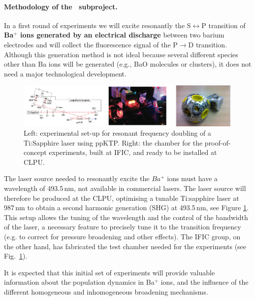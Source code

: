 \paragraph{Methodology of the \BATA\ subproject.}

In a first round of experiments we will excite resonantly the S$\leftrightarrow$P transition of {\bf Ba$^+$ ions generated by an electrical discharge} between two barium electrodes and will collect the fluorescence signal of the P$\rightarrow$D transition. Although this generation method is not ideal because several different species other than Ba ions will be generated (e.g., BaO molecules or clusters), it does not need a major technological development. 

\begin{figure}
\begin{center}
\includegraphics[width=0.99\textwidth]{img/blueLaser.png}
\caption{\small Left: experimental set-up for resonant frequency doubling of a 
Ti:Sapphire laser using ppKTP. Right: the chamber for the proof-of-concept experiments, built at IFIC, and ready to be installed at CLPU.}
\label{fig:chamber}
\end{center}
\end{figure}

The laser source needed to resonantly excite the $Ba^{+}$ ions must have a wavelength of 493.5\,nm, not available in commercial lasers. The laser source will therefore be produced at the CLPU, optimising a tunable Ti:sapphire laser at 987\,nm to obtain a second harmonic generation (SHG) at 493.5\,nm, see Figure \ref{fig:chamber}. This setup allows the tuning of the wavelength and the control of the bandwidth of the laser, a necessary feature to precisely tune it to the transition frequency (e.g. to correct for pressure broadening and other effects). The IFIC group, on the other hand, has fabricated the test chamber needed for the experiments (see Fig.~\ref{fig:chamber}). 

It is expected that this initial set of experiments will provide valuable information about the population dynamics in Ba$^+$ ions, and the influence of the different homogeneous and inhomogeneous broadening mechanisms. 

